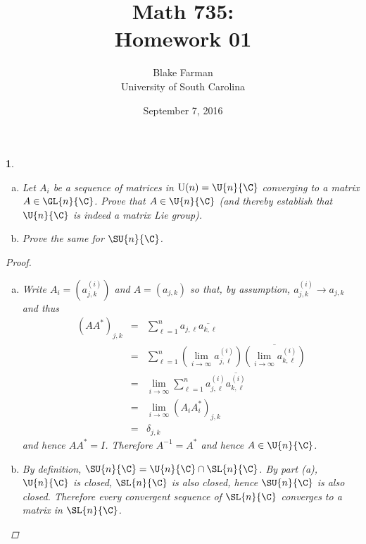 \documentclass[10pt]{amsart}
\author{Blake Farman\\University of South Carolina}
\title{Math 735:\\Homework 01}
\date{September 7, 2016}
\begin{document}
\maketitle

\providecommand{\p}{\mathfrak{p}}
\providecommand{\m}{\mathfrak{m}}
\providecommand{\Deck}[1]{\operatorname{Deck}\left(#1\right)}
\newtheorem{thm}{Theorem}
\newtheorem{ex}{}
\newtheorem{lem}{Lemma}
\newtheorem{prop}{Proposition}
\theoremstyle{definition}
\newtheorem{defn}{Definition}

\newcommand{\A}{\mathbb{A}}

\begin{ex}\label{thm1}
  \begin{enumerate}[(a)]
  \item
    Let $A_i$ be a sequence of matrices in $\operatorname{U}(n) = \U{n}{\C}$ converging to a matrix $A \in \GL{n}{\C}$.
    Prove that $A \in \U{n}{\C}$ (and thereby establish that $\U{n}{\C}$ is indeed a matrix Lie group).
  \item
    Prove the same for $\SU{n}{\C}$.
  \end{enumerate}
  \begin{proof}
    \begin{enumerate}[(a)]
    \item
      Write $A_i = \left(a_{j,k}^{(i)}\right)$ and $A = \left(a_{j,k}\right)$ so that, by assumption, $a_{j,k}^{(i)} \rightarrow a_{j,k}$ and thus
      \begin{eqnarray*}
        (AA^*)_{j,k} &=& \sum_{\ell = 1}^n a_{j,\ell}\overline{a_{k,\ell}}\\
        &=& \sum_{\ell = 1}^n \left(\lim_{i \rightarrow \infty}a_{j,\ell}^{(i)}\right)\overline{\left(\lim_{i \rightarrow \infty}a_{k,\ell}^{(i)}\right)}\\
        &=& \lim_{i \rightarrow \infty}\sum_{\ell = 1}^n a_{j,\ell}^{(i)}\overline{a_{k,\ell}^{(i)}}\\
        &=& \lim_{i \rightarrow \infty} (A_iA_i^*)_{j,k}\\
        &=& \delta_{j,k}
      \end{eqnarray*}
      and hence $AA^* = I$.
      Therefore $A^{-1} = A^*$ and hence $A \in \U{n}{\C}$.
    \item
      By definition, $\SU{n}{\C} = \U{n}{\C} \cap \SL{n}{\C}$.
      By part (a), $\U{n}{\C}$ is closed, $\SL{n}{\C}$ is also closed, hence $\SU{n}{\C}$ is also closed.
      Therefore every convergent sequence of $\SL{n}{\C}$ converges to a matrix in $\SL{n}{\C}$.
    \end{enumerate}
  \end{proof}
\end{ex}
\end{document}
